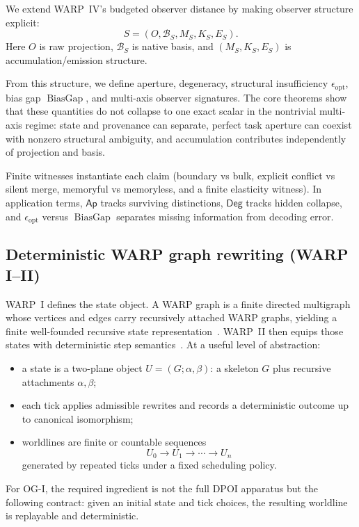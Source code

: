 \documentclass[11pt,twoside]{article}
\theoremstyle{definition}
\DeclareMathOperator{\BiasGap}{BiasGap}
\begin{document}
We extend WARP~IV's budgeted observer distance by making observer structure explicit:
\[
  S=(O,\mathcal{B}_S,M_S,K_S,E_S).
\]
Here \(O\) is raw projection, \(\mathcal{B}_S\) is native basis, and \((M_S,K_S,E_S)\) is accumulation/emission structure.

From this structure, we define aperture, degeneracy, structural insufficiency \(\epsilon_{\mathrm{opt}}\), bias gap \(\BiasGap\), and multi-axis observer signatures. The core theorems show that these quantities do not collapse to one exact scalar in the nontrivial multi-axis regime: state and provenance can separate, perfect task aperture can coexist with nonzero structural ambiguity, and accumulation contributes independently of projection and basis.

Finite witnesses instantiate each claim (boundary vs bulk, explicit conflict vs silent merge, memoryful vs memoryless, and a finite elasticity witness). In application terms, \(\mathsf{Ap}\) tracks surviving distinctions, \(\mathsf{Deg}\) tracks hidden collapse, and \(\epsilon_{\mathrm{opt}}\) versus \(\BiasGap\) separates missing information from decoding error.

\subsection{Deterministic WARP graph rewriting (WARP I--II)}
\label{subsec:tldr-warp-rewriting}

WARP~I defines the state object. A WARP graph is a finite directed multigraph whose vertices and edges carry recursively attached WARP graphs, yielding a finite well-founded recursive state representation~\cite{ross_paper_i}. WARP~II then equips those states with deterministic step semantics~\cite{ross_paper_ii}. At a useful level of abstraction:
\begin{itemize}[leftmargin=*]
  \item a state is a two-plane object \(U=(G;\alpha,\beta)\): a skeleton \(G\) plus recursive attachments \(\alpha,\beta\);
  \item each tick applies admissible rewrites and records a deterministic outcome up to canonical isomorphism;
  \item worldlines are finite or countable sequences
        \[
          U_0 \to U_1 \to \cdots \to U_n
        \]
        generated by repeated ticks under a fixed scheduling policy.
\end{itemize}
For OG-I, the required ingredient is not the full DPOI apparatus but the following contract: given an initial state and tick choices, the resulting worldline is replayable and deterministic.
\end{document}
